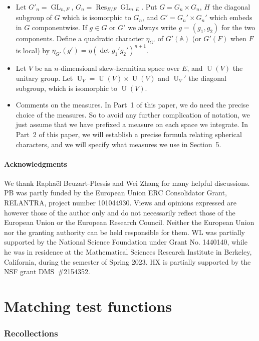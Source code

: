\documentclass[letterpaper,11pt]{amsart}
\newcommand{\bA}{\mathbb{A}}
\newcommand{\<}{\negthickspace}
\DeclareMathOperator{\GL}{GL}
\DeclareMathOperator{\U}{U}
\DeclareMathOperator{\Res}{Res}
\theoremstyle{definition}
\theoremstyle{plain}
\theoremstyle{remark}
\numberwithin{equation}{section}
\begin{document}
\begin{itemize}
\item Let $G'_n = \GL_{n, F}$, $G_n = \Res_{E/F} \GL_{n, E}$. Put $G = G_n \times G_n$, $H$ the diagonal subgroup of $G$ which is isomorphic to $G_n$, and $G' = G_n' \times G_n'$ which embeds in $G$ componentwise. If $g \in G$ or $G'$ we always write $g = (g_1, g_2)$ for the two components. Define a quadratic character $\eta_{G'}$ of $G'(\bA)$ (or $G'(F)$ when $F$ is local) by $\eta_{G'}(g') = \eta(\det g_1'g_2')^{n+1}$.

\item Let $V$ be an $n$-dimensional skew-hermitian space over $E$, and $\U(V)$ the unitary group. Let $\U_V = \U(V) \times \U(V)$ and $\U_V'$ the diagonal subgroup, which is isomorphic to $\U(V)$. 

\item Comments on the measures. In Part~1 of this paper, we do need the precise choice of the measures. So to avoid any further complication of notation, we just assume that we have prefixed a measure on each space we integrate. In Part~2 of this paper, we will establish a precise formula relating spherical characters, and we will specify what measures we use in Section~5.
\end{itemize}


\subsection{Acknowledgments}
We thank Rapha\"el Beuzart-Plessis and Wei Zhang for many helpful discussions.
PB was partly funded by the European Union ERC Consolidator Grant, RELANTRA, project number 101044930. Views and opinions expressed are however those of the author only and do not necessarily reflect those of the European Union or the European Research Council. Neither the European Union nor the granting authority can be held responsible for them. WL was partially supported by the National Science Foundation under Grant No. 1440140, while he was in residence at the Mathematical Sciences Research Institute in Berkeley, California, during the semester of Spring 2023. HX is partially supported by the NSF grant DMS~\#2154352.






\part{Matching test functions}


\section{Recollections}
\end{document}
